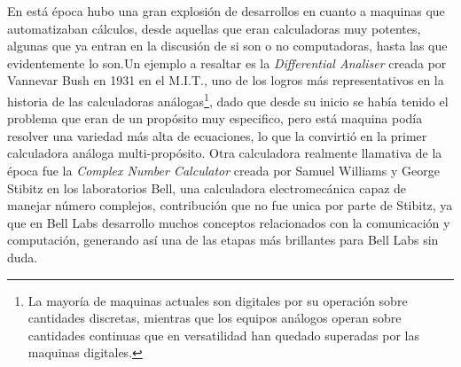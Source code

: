 \documentclass[letterpaper,12pt,oneside]{book}
\begin{document}
		En está época hubo una gran explosión de desarrollos en cuanto a maquinas que automatizaban cálculos, desde
		aquellas que eran calculadoras muy potentes, algunas que ya entran en la discusión de si son o no computadoras, hasta las que evidentemente lo son.Un ejemplo a 
		resaltar es la \textit{Differential Analiser} creada por Vannevar Bush en 1931 en el M.I.T., uno de los logros más representativos en la historia de las calculadoras
		análogas\footnote{La mayoría de maquinas actuales son digitales por su operación sobre cantidades discretas, mientras que los equipos análogos operan
		sobre cantidades continuas que en versatilidad han quedado superadas por las maquinas digitales.}, dado que desde su inicio se había tenido el problema que eran de un 
		propósito muy especifico, pero está maquina podía resolver una variedad
		más alta de ecuaciones, lo que la convirtió en la primer calculadora análoga multi-propósito\cite[p.158]{ifrah_universal_2001}.
		Otra calculadora realmente llamativa de la época fue la \textit{Complex Number Calculator} creada por		
		Samuel Williams y George Stibitz en los laboratorios Bell, una calculadora electromecánica capaz
		de manejar número complejos, contribución que no fue unica por parte de Stibitz, ya que en Bell Labs desarrollo muchos conceptos relacionados con la
		comunicación y computación, generando así una de las etapas más brillantes para Bell Labs sin duda\cite[p.207]{ifrah_universal_2001}.
		
\end{document}
